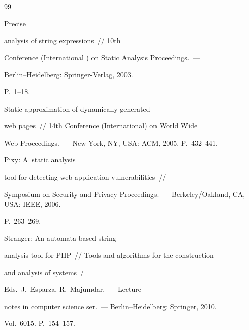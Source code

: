 {\small\frenchspacing


{%




\begin{thebibliography}{99}







 Precise 


analysis of string expressions~/\!\!/ 10th 


Conference (International ) on Static Analysis Proceedings.~--- 


Berlin--Heidelberg: Springer-Verlag, 2003. 


P.~1--18.







 Static approximation of dynamically generated 


web pages~/\!\!/   14th  Conference (International) on World Wide 


Web Proceedings.~--- New York, NY, USA: ACM, 2005. P.~432--441.







 Pixy: A~static analysis 


tool for detecting web application vulnerabilities~/\!\!/ 


Symposium on Security and Privacy  Proceedings.~--- Berkeley/Oakland, CA, USA: IEEE, 2006. 


P.~263--269.







 Stranger: An automata-based string 


analysis tool for PHP~/\!\!/ Tools and algorithms for the construction 


and analysis of systems~/


Eds.\ J.~Esparza, R.~Majumdar.~--- Lecture


notes in computer science ser.~--- Berlin--Heidelberg: Springer, 2010. 


Vol.~6015. P.~154--157.






\end{thebibliography}}}
